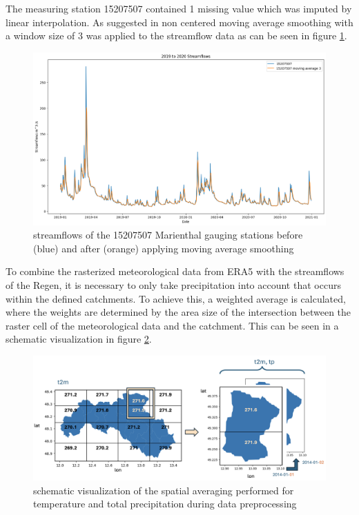 \documentclass[
]{krantz}
\begin{document}
The measuring station 15207507 contained 1 missing value which was imputed by linear interpolation. As suggested in \citet{sabzipour} non centered moving average smoothing with a window size of 3 was applied to the streamflow data as can be seen in figure \ref{fig:marien-stream}.

\begin{figure}

{\centering \includegraphics[width=0.8\linewidth]{work/07-hydroLSTM/images/Moving_Average} 

}

\caption{streamflows of the 15207507 Marienthal gauging stations before (blue) and after (orange) applying moving average smoothing}\label{fig:marien-stream}
\end{figure}

To combine the rasterized meteorological data from ERA5 with the streamflows of the Regen, it is necessary to only take precipitation into account that occurs within the defined catchments. To achieve this, a weighted average is calculated, where the weights are determined by the area size of the intersection between the raster cell of the meteorological data and the catchment. This can be seen in a schematic visualization in figure \ref{fig:spatial-avg}.

\begin{figure}

{\centering \includegraphics[width=0.8\linewidth]{work/07-hydroLSTM/images/spatial_averaging} 

}

\caption{schematic visualization of the spatial averaging performed for temperature and total precipitation during data preprocessing}\label{fig:spatial-avg}
\end{figure}
\end{document}
